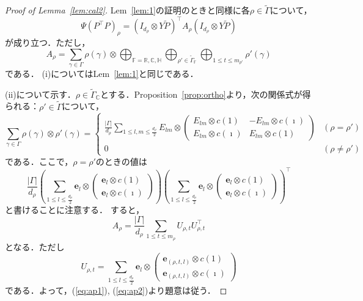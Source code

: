 \documentclass[11pt]{article}
\theoremstyle{definition}
\begin{document}
\begin{proof}[Proof of Lemma~\ref{lem:cal2}]
    Lem~\ref{lem:1}の証明のときと同様に各$\rho \in \tilde{\Gamma}$について，
    \begin{equation} \label{eq:ap1}
        \Psi(P^\top P)_\rho = (I_{d_\rho}\otimes Y\tilde{P})^\top A_\rho (I_{d_\rho}\otimes Y\tilde{P})
    \end{equation}
    が成り立つ．ただし，
    \[
        A_\rho =\sum_{\gamma \in \Gamma} \rho(\gamma) \otimes 
        \bigoplus_{\mathbb{F}= \mathbb{R}, \mathbb{C}, \mathbb{H}} \bigoplus_{\rho' \in \tilde{\Gamma}_\mathbb{F}} 
        \bigoplus_{1 \leq t \leq m_{\rho'}} \rho'(\gamma)
    \]
    である．
    (i)についてはLem~\ref{lem:1}と同じである．
    
    (ii)について示す．$\rho \in \tilde{\Gamma}_\mathbb{C}$とする．Proposition~\ref{prop:ortho}より，次の関係式が得られる：$\rho' \in \tilde{\Gamma}$について，
        \[
            \sum_{\gamma \in \Gamma} \rho(\gamma) \otimes \rho'(\gamma) = 
            \begin{cases}
                \frac{|\Gamma|}{d_\rho} \sum_{1 \leq l,m \leq \frac{d_\rho}{2}} E_{lm} \otimes \begin{pmatrix}
                    E_{lm} \otimes c(1) & -E_{lm} \otimes c(\imath) \\ 
                    E_{lm} \otimes c(\imath) & E_{lm} \otimes c(1)
                \end{pmatrix}
                & (\rho=\rho') \\
                0 & (\rho \neq \rho')
            \end{cases}
        \]
        である．ここで，$\rho=\rho'$のときの値は
        \[
            \frac{|\Gamma|}{d_\rho}
            \left( \sum_{1 \leq l \leq \frac{d_\rho}{2}} \bm{e}_l \otimes \begin{pmatrix} \bm{e}_l \otimes c(1) \\ \bm{e}_l \otimes c(\imath) \end{pmatrix} \right)
            \left( \sum_{1 \leq l \leq \frac{d_\rho}{2}} \bm{e}_l \otimes \begin{pmatrix} \bm{e}_l \otimes c(1) \\ \bm{e}_l \otimes c(\imath) \end{pmatrix} \right)^\top
        \]
        と書けることに注意する．
        すると，
        \begin{equation} \label{eq:ap2}
            A_\rho = \frac{|\Gamma|}{d_\rho} \sum_{1 \leq t \leq m_\rho} U_{\rho,t}U_{\rho,t}^\top
        \end{equation}
        となる．ただし
        \[
            U_{\rho,t}= \sum_{1 \leq l \leq \frac{d_\rho}{2}} \bm{e}_l \otimes
        \begin{pmatrix} \bm{e}_{(\rho,t,l)} \otimes c(1) \\ \bm{e}_{(\rho,t,l)} \otimes c(\imath) \end{pmatrix} 
        \]である．よって，(\ref{eq:ap1}), (\ref{eq:ap2})より題意は従う．
    

\end{proof}
\end{document}
